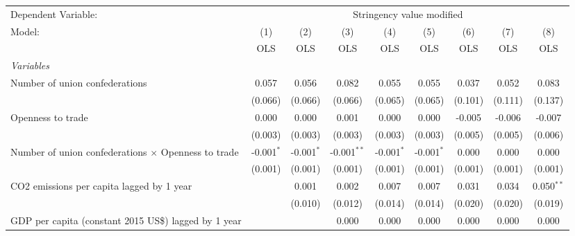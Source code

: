 
\begingroup
\centering
\begin{tabular}{lcccccccc}
   \toprule
   Dependent Variable: & \multicolumn{8}{c}{Stringency value modified}\\
   Model:                                                     & (1)          & (2)          & (3)           & (4)          & (5)          & (6)          & (7)           & (8)\\  
                                                              &  OLS         & OLS          & OLS           & OLS          & OLS          & OLS          & OLS           & OLS\\  
   \midrule
   \emph{Variables}\\
   Number of union confederations                             & 0.057        & 0.056        & 0.082         & 0.055        & 0.055        & 0.037        & 0.052         & 0.083\\   
                                                              & (0.066)      & (0.066)      & (0.066)       & (0.065)      & (0.065)      & (0.101)      & (0.111)       & (0.137)\\   
   Openness to trade                                          & 0.000        & 0.000        & 0.001         & 0.000        & 0.000        & -0.005       & -0.006        & -0.007\\   
                                                              & (0.003)      & (0.003)      & (0.003)       & (0.003)      & (0.003)      & (0.005)      & (0.005)       & (0.006)\\   
   Number of union confederations $\times$ Openness to trade  & -0.001$^{*}$ & -0.001$^{*}$ & -0.001$^{**}$ & -0.001$^{*}$ & -0.001$^{*}$ & 0.000        & 0.000         & 0.000\\   
                                                              & (0.001)      & (0.001)      & (0.001)       & (0.001)      & (0.001)      & (0.001)      & (0.001)       & (0.001)\\   
   CO2 emissions per capita lagged by 1 year                  &              & 0.001        & 0.002         & 0.007        & 0.007        & 0.031        & 0.034         & 0.050$^{**}$\\   
                                                              &              & (0.010)      & (0.012)       & (0.014)      & (0.014)      & (0.020)      & (0.020)       & (0.019)\\   
   GDP per capita (constant 2015 US\$) lagged by 1 year       &              &              & 0.000         & 0.000        & 0.000        & 0.000        & 0.000         & 0.000\\   

\end{tabular}
